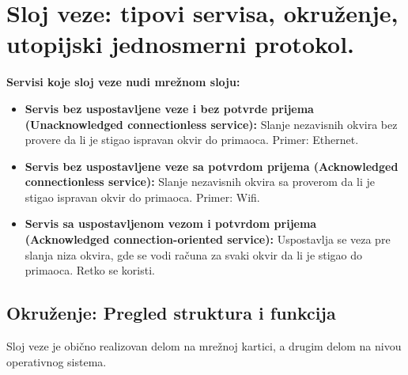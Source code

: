 \documentclass[a4paper]{article}
\begin{document}
\section{Sloj veze: tipovi servisa, okruženje, utopijski jednosmerni protokol.}
    \noindent \textbf{Servisi koje sloj veze nudi mrežnom sloju:}
    \begin{itemize}
        \item \textbf{Servis bez uspostavljene veze i bez potvrde prijema (Unacknowledged connectionless 
              service):} Slanje nezavisnih okvira bez provere da li je stigao ispravan okvir 
              do primaoca. Primer: Ethernet. 
        \item \textbf{Servis bez uspostavljene veze sa potvrdom prijema (Acknowledged connectionless 
              service):} Slanje nezavisnih okvira sa proverom da li je stigao ispravan okvir do 
              primaoca. Primer: Wifi.
        \item \textbf{Servis sa uspostavljenom vezom i potvrdom prijema (Acknowledged 
              connection-oriented service):} Uspostavlja se veza pre slanja niza
              okvira, gde se vodi računa za svaki okvir da li je stigao do primaoca.
              Retko se koristi.
    \end{itemize}

    \subsection{Okruženje: Pregled struktura i funkcija}
    Sloj veze je obično realizovan delom na mrežnoj kartici, a drugim delom na nivou operativnog
    sistema. \\
\end{document}
